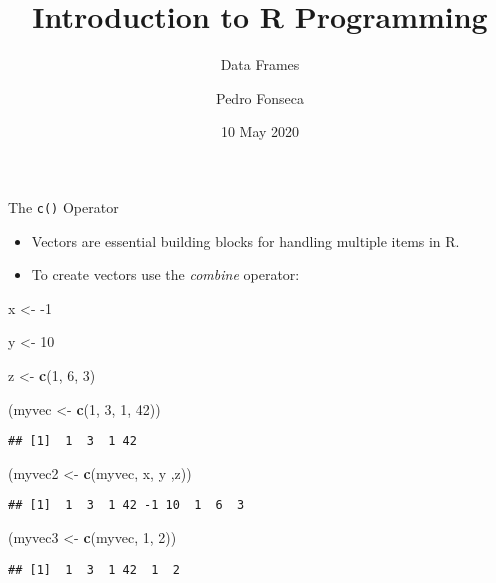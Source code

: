 \documentclass[ignorenonframetext,]{beamer}
\title{Introduction to R Programming}
\subtitle{Data Frames}
\author{Pedro Fonseca}
\date{10 May 2020}
\newenvironment{Shaded}{\begin{snugshade}}{\end{snugshade}}
\newcommand{\DecValTok}[1]{\textcolor[rgb]{0.00,0.00,0.81}{#1}}
\newcommand{\KeywordTok}[1]{\textcolor[rgb]{0.13,0.29,0.53}{\textbf{#1}}}
\newcommand{\NormalTok}[1]{#1}
\newcommand{\StringTok}[1]{\textcolor[rgb]{0.31,0.60,0.02}{#1}}
\begin{document}
\frame{\titlepage}

\begin{frame}[fragile]{The \texttt{c()} Operator}
\protect\hypertarget{the-c-operator}{}

\begin{itemize}
\item
  Vectors are essential building blocks for handling multiple items in
  R.
\item
  To create vectors use the \emph{combine} operator:
\end{itemize}

\begin{Shaded}
\begin{Highlighting}[]
\NormalTok{x <-}\StringTok{  }\DecValTok{-1}

\NormalTok{y <-}\StringTok{  }\DecValTok{10}

\NormalTok{z <-}\StringTok{  }\KeywordTok{c}\NormalTok{(}\DecValTok{1}\NormalTok{, }\DecValTok{6}\NormalTok{, }\DecValTok{3}\NormalTok{)}

\NormalTok{(myvec <-}\StringTok{ }\KeywordTok{c}\NormalTok{(}\DecValTok{1}\NormalTok{, }\DecValTok{3}\NormalTok{, }\DecValTok{1}\NormalTok{, }\DecValTok{42}\NormalTok{))}
\end{Highlighting}
\end{Shaded}

\begin{verbatim}
## [1]  1  3  1 42
\end{verbatim}

\begin{Shaded}
\begin{Highlighting}[]
\NormalTok{(myvec2 <-}\StringTok{ }\KeywordTok{c}\NormalTok{(myvec, x, y ,z))}
\end{Highlighting}
\end{Shaded}

\begin{verbatim}
## [1]  1  3  1 42 -1 10  1  6  3
\end{verbatim}

\begin{Shaded}
\begin{Highlighting}[]
\NormalTok{(myvec3 <-}\StringTok{  }\KeywordTok{c}\NormalTok{(myvec, }\DecValTok{1}\NormalTok{, }\DecValTok{2}\NormalTok{))}
\end{Highlighting}
\end{Shaded}

\begin{verbatim}
## [1]  1  3  1 42  1  2
\end{verbatim}

\end{frame}
\end{document}
